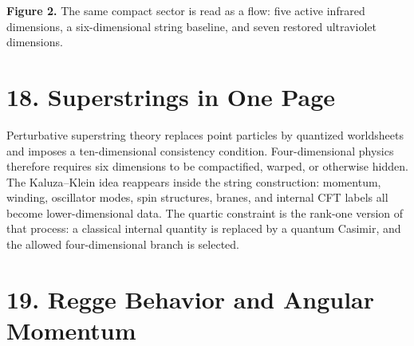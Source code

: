 \documentclass[11pt]{article}
\begin{document}
\begin{center}

\textbf{Figure 2.} The same compact sector is read as a flow: five active infrared dimensions, a six-dimensional string baseline, and seven restored ultraviolet dimensions.
\end{center}


\section*{18. Superstrings in One Page}

Perturbative superstring theory replaces point particles by quantized worldsheets and imposes a ten-dimensional consistency condition. Four-dimensional physics therefore requires six dimensions to be compactified, warped, or otherwise hidden. The Kaluza--Klein idea reappears inside the string construction: momentum, winding, oscillator modes, spin structures, branes, and internal CFT labels all become lower-dimensional data. The quartic constraint is the rank-one version of that process: a classical internal quantity is replaced by a quantum Casimir, and the allowed four-dimensional branch is selected.


\section*{19. Regge Behavior and Angular Momentum}
\end{document}
